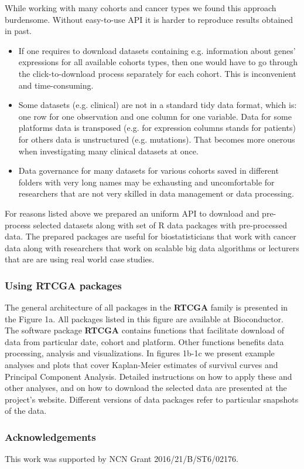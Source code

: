 \documentclass{bioinfo}
\begin{document}
While working with many cohorts and cancer types we found this approach burdensome. Without easy-to-use API it is harder to reproduce results obtained in past.
\begin{itemize}
\item If one requires to download datasets containing e.g. information about genes' expressions for all available cohorts types, then one would have to go through the click-to-download process separately for each cohort. This is inconvenient and time-consuming.
\item Some datasets (e.g. clinical) are not in a standard tidy data format, which is: one row for one observation and one column for one variable. Data for some platforms data is transposed (e.g. for expression columns stands for patients) for others data is unstructured (e.g. mutations). That becomes more onerous when investigating many clinical datasets at once.
\item Data governance for many datasets for various cohorts saved in different folders with very long names may be exhausting and uncomfortable for researchers that are not very skilled in data management or data processing.
\end{itemize}
For reasons listed above we prepared an uniform API to download and pre-process selected datasets along with set of R data packages with pre-processed data. 
The prepared packages are useful for biostatisticians that work with cancer data along with researchers that work on scalable big data algorithms or lecturers that are are using real world case studies.

\subsubsection*{Using RTCGA packages}
The general architecture of all packages in the \textbf{RTCGA} family is presented in the Figure 1a. All packages listed in this figure are available at Bioconductor.
The software package \textbf{RTCGA} contains functions that facilitate download of data from particular date, cohort and platform. Other functions benefits data processing, analysis and visualizations. In figures 1b-1c we present example analyses and plots that cover Kaplan-Meier estimates of survival curves and Principal Component Analysis. Detailed instructions on how to apply these and other analyses, and on how to download the selected data are presented at the project's website. Different versions of data packages refer to particular snapshots of the data. 


\subsubsection*{Acknowledgements}
This work was supported by NCN Grant 2016/21/B/ST6/02176.


%
%
%
%
%
%
%

\end{document}
